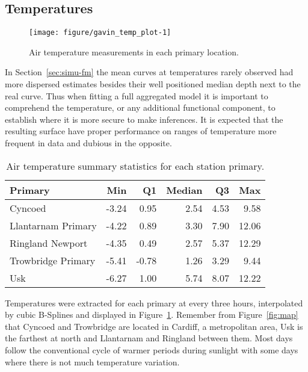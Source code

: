 \subsection{Temperatures}
\label{sec:temp}

\begin{figure}[t]\centering
\begin{knitrout}
\color{fgcolor}
\texttt{[image: figure/gavin\_temp\_plot-1]} 

\end{knitrout}
\caption{Air temperature measurements in each primary location.}
\label{fig:temp-prim}
\end{figure}

In Section~\ref{sec:simu-fm} the mean curves at temperatures rarely observed had more dispersed estimates besides their well positioned median depth next to the real curve. Thus when fitting a full aggregated model it is important to comprehend the temperature, or any additional functional component, to establish where it is more secure to make inferences. It is expected that the resulting surface have proper performance on ranges of temperature more frequent in data and dubious in the opposite.



\begin{table}[b]
  \centering
\caption{Air temperature summary statistics for each station primary.}
\begin{knitrout}
\color{fgcolor}
\begin{tabular}{lrrrrr}
\toprule
Primary & Min & Q1 & Median & Q3 & Max\\
\midrule
Cyncoed & -3.24 & 0.95 & 2.54 & 4.53 & 9.58\\
Llantarnam Primary & -4.22 & 0.89 & 3.30 & 7.90 & 12.06\\
Ringland Newport & -4.35 & 0.49 & 2.57 & 5.37 & 12.29\\
Trowbridge Primary & -5.41 & -0.78 & 1.26 & 3.29 & 9.44\\
Usk & -6.27 & 1.00 & 5.74 & 8.07 & 12.22\\
\bottomrule
\end{tabular}


\end{knitrout}
\label{tab:gavin-temp-tab}
\end{table}

Temperatures were extracted for each primary at every three hours, interpolated by cubic B-Splines and displayed in Figure~\ref{fig:temp-prim}. Remember from Figure~\ref{fig:map} that Cyncoed and Trowbridge are located in Cardiff, a metropolitan area, Usk is the farthest at north and Llantarnam and Ringland between them. Most days follow the conventional cycle of warmer periods during sunlight with some days where there is not much temperature variation.

